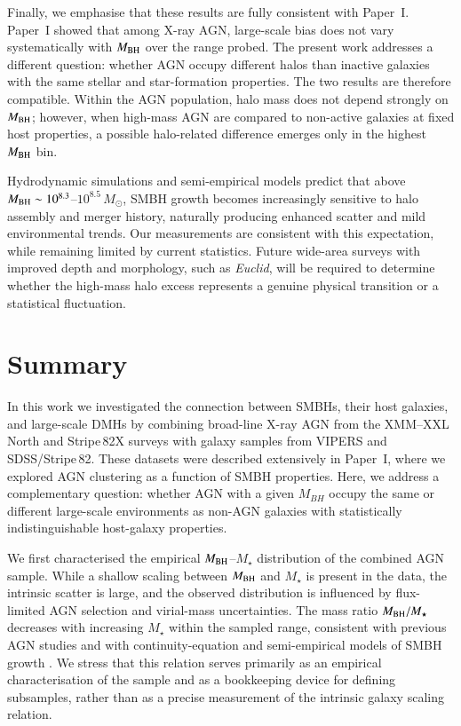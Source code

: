 \documentclass{aa}
\begin{document}
Finally, we emphasise that these results are fully consistent with Paper~I. 
Paper~I showed that among X-ray AGN, large-scale bias does not vary systematically with $M_{\rm BH}$ over the range probed. 
The present work addresses a different question: whether AGN occupy different halos than inactive galaxies with the same stellar and star-formation properties. 
The two results are therefore compatible. 
Within the AGN population, halo mass does not depend strongly on $M_{\rm BH}$; however, when high-mass AGN are compared to non-active galaxies at fixed host properties, a possible halo-related difference emerges only in the highest $M_{\rm BH}$ bin.

Hydrodynamic simulations 
\citep[e.g.][]{AnglesAlcazar2017, Habouzit2017, Dubois2021} 
and semi-empirical models 
\citep[e.g.][]{Shankar2013, Shankar2016, Shankar2020} 
predict that above 
$M_{\rm BH}\sim10^{8.3}$--$10^{8.5}\,M_\odot$, 
SMBH growth becomes increasingly sensitive to halo assembly and merger history, naturally producing enhanced scatter and mild environmental trends. 
Our measurements are consistent with this expectation, while remaining limited by current statistics. 
Future wide-area surveys with improved depth and morphology, such as \textit{Euclid}, will be required to determine whether the high-mass halo excess represents a genuine physical transition or a statistical fluctuation.


\section{Summary}
\label{sec_summary}

In this work we investigated the connection between SMBHs,
their host galaxies, and large-scale DMHs by combining
broad-line X-ray AGN from the XMM--XXL North and Stripe\,82X surveys with galaxy samples
from VIPERS and SDSS/Stripe\,82. These datasets were described extensively in
Paper~I, where we explored AGN clustering as a
function of SMBH properties. Here, we address a complementary question:
whether AGN with a given $M_{BH}$ occupy the same or different
large-scale environments as non-AGN galaxies with statistically indistinguishable
host-galaxy properties.

We first characterised the empirical $M_{\rm BH}$--$M_{\star}$ distribution of the
combined AGN sample. While a shallow scaling between $M_{\rm BH}$ and $M_{\star}$
is present in the data, the intrinsic scatter is large, and the observed
distribution is influenced by flux-limited AGN selection and virial-mass
uncertainties. The mass ratio $M_{\rm BH}/M_{\star}$ decreases with increasing
$M_{\star}$ within the sampled range, consistent with previous AGN studies and
with continuity-equation and semi-empirical models of SMBH growth
\citep[e.g.][]{Aversa2016, Shankar2016, Shankar2020}.
We stress that this relation serves primarily as an empirical characterisation
of the sample and as a bookkeeping device for defining subsamples, rather than
as a precise measurement of the intrinsic galaxy scaling relation.
\end{document}
